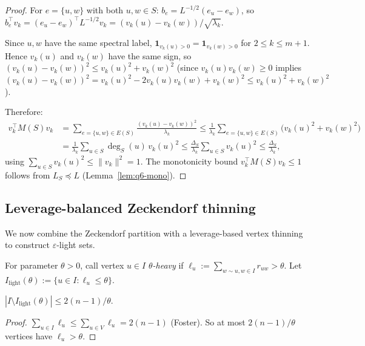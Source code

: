 \begin{proof}
For $e=\{u,w\}$ with both $u,w\in S$:
$b_e=L^{-1/2}(e_u-e_w)$, so $b_e^\top v_k = (e_u-e_w)^\top L^{-1/2}v_k
= (v_k(u)-v_k(w))/\sqrt{\lambda_k}$.

Since $u,w$ have the same spectral label,
$\mathbf{1}_{v_k(u)>0}=\mathbf{1}_{v_k(w)>0}$ for $2\le k\le m+1$.
Hence $v_k(u)$ and $v_k(w)$ have the same sign, so
$(v_k(u)-v_k(w))^2 \le v_k(u)^2 + v_k(w)^2$
(since $v_k(u)v_k(w)\ge 0$ implies
$(v_k(u)-v_k(w))^2 = v_k(u)^2 - 2v_k(u)v_k(w) + v_k(w)^2
\le v_k(u)^2 + v_k(w)^2$).

Therefore:
\begin{align*}
v_k^\top M(S) v_k
&= \sum_{e=\{u,w\}\in E(S)} \frac{(v_k(u)-v_k(w))^2}{\lambda_k}
\le \frac{1}{\lambda_k}\sum_{e=\{u,w\}\in E(S)}
  \bigl(v_k(u)^2+v_k(w)^2\bigr)\\
&= \frac{1}{\lambda_k}\sum_{u\in S}\deg_S(u)\,v_k(u)^2
\le \frac{\Delta_S}{\lambda_k}\sum_{u\in S}v_k(u)^2
\le \frac{\Delta_S}{\lambda_k},
\end{align*}
using $\sum_{u\in S}v_k(u)^2\le\|v_k\|^2=1$.
The monotonicity bound $v_k^\top M(S)v_k\le 1$ follows from
$L_S\preceq L$ (Lemma~\ref{lem:q6-mono}).
\end{proof}


\subsection{Leverage-balanced Zeckendorf thinning}

We now combine the Zeckendorf partition with a leverage-based
vertex thinning to construct $\varepsilon$-light sets.

\begin{definition}
For parameter $\theta>0$, call vertex $u\in I$ \emph{$\theta$-heavy}
if $\ell_u:=\sum_{w\sim u,w\in I}r_{uw}>\theta$.
Let $I_{\mathrm{light}}(\theta):=\{u\in I:\ell_u\le\theta\}$.
\end{definition}

\begin{lemma}\label{lem:omega-q6-heavy}
$|I\setminus I_{\mathrm{light}}(\theta)| \le 2(n-1)/\theta$.
\end{lemma}

\begin{proof}
$\sum_{u\in I}\ell_u \le \sum_{u\in V}\ell_u = 2(n-1)$ (Foster).
So at most $2(n-1)/\theta$ vertices have $\ell_u>\theta$.
\end{proof}

